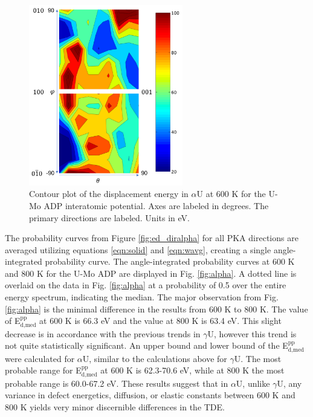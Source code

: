 \documentclass[review]{elsarticle}
\begin{document}
\begin{figure}[h]
 \centering
 \includegraphics[width=0.6\textwidth]{600K_contourA.png} 
 \caption{Contour plot of the displacement energy in $\alpha$U at 600 K for the U-Mo ADP interatomic potential. Axes are labeled in degrees. The primary directions are labeled. Units in eV.}
 \label{fig:600Kcontour}
\end{figure}

\FloatBarrier

The probability curves from Figure \ref{fig:ed_diralpha} for all PKA directions are averaged utilizing equations \ref{eqn:solid} and \ref{eqn:wavg}, creating a single angle-integrated probability curve. The angle-integrated probability curves at 600 K and 800 K for the U-Mo ADP are displayed in Fig. \ref{fig:alpha}. A dotted line is overlaid on the data in Fig. \ref{fig:alpha} at a probability of 0.5 over the entire energy spectrum, indicating the median. The major observation from Fig. \ref{fig:alpha} is the minimal difference in the results from 600 K to 800 K. The value of E$^{\textrm{pp}}_{\textrm{d,med}}$ at 600 K is 66.3 eV and the value at 800 K is 63.4 eV. This slight decrease is in accordance with the previous trends in $\gamma$U, however this trend is not quite statistically significant. An upper bound and lower bound of the E$^{\textrm{pp}}_{\textrm{d,med}}$ were calculated for $\alpha$U, similar to the calculations above for $\gamma$U. The most probable range for E$^{\textrm{pp}}_{\textrm{d,med}}$ at 600 K is 62.3-70.6 eV, while at 800 K the most probable range is 60.0-67.2 eV. These results suggest that in $\alpha$U, unlike $\gamma$U, any variance in defect energetics, diffusion, or elastic constants between 600 K and 800 K yields very minor discernible differences in the TDE.
\end{document}
